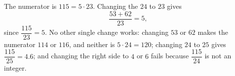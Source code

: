 The numerator is $115=5\cdot23$. Changing the $24$ to $23$ gives
\[\boxed{\dfrac{53+62}{23}=5},\]
since $\dfrac{115}{23}=5$. No other single change works: changing $53$ or $62$ makes the numerator $114$ or $116$, and neither is $5\cdot24=120$; changing $24$ to $25$ gives $\dfrac{115}{25}=4.6$; and changing the right side to $4$ or $6$ fails because $\dfrac{115}{24}$ is not an integer.
